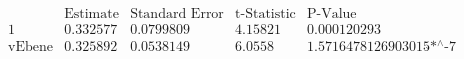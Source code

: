 \[\begin{array}{l|llll}
 \text{} & \text{Estimate} & \text{Standard Error} & \text{t-Statistic} & \text{P-Value} \\
\hline
 1 & 0.332577 & 0.0799809 & 4.15821 & 0.000120293 \\
 \text{vEbene} & 0.325892 & 0.0538149 & 6.0558 & \text{1.5716478126903015$\grave{ }$*${}^{\wedge}$-7} \\
\end{array}\]

